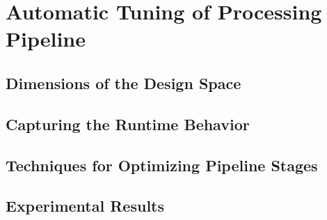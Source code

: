 \chapter{Automatic Tuning of Processing Pipeline}
\label{profileChap}

\section{Dimensions of the Design Space}
\newpage
\section{Capturing the Runtime Behavior}
\newpage
\section{Techniques for Optimizing Pipeline Stages}
\newpage
\section{Experimental Results}

